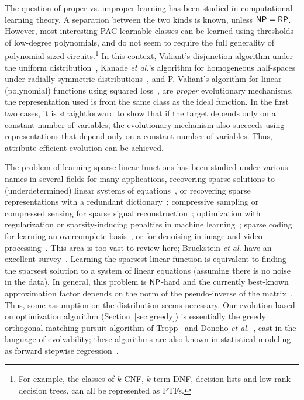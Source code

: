 \documentclass[11pt]{article}
\begin{document}
The question of proper vs. improper learning has been studied in computational
learning theory. A separation between the two kinds is known, unless $\mathsf{NP} =
\mathsf{RP}$. However, most interesting PAC-learnable classes can be learned using
thresholds of low-degree polynomials, and do not seem to require the full
generality of polynomial-sized circuits.\footnote{For example, the classes of
$k$-CNF, $k$-term DNF, decision lists and low-rank decision trees, can all be
represented as PTFs.} In this context, Valiant's disjunction algorithm under the
uniform distribution~\cite{Valiant:2009-evolvability}, Kanade {\it et al.}'s
algorithm for homogeneous half-spaces under radially symmetric
distributions~\cite{KVV:2010-drift}, and P. Valiant's algorithm for linear
(polynomial) functions using squared loss~\cite{Valiant:2012-real}, are
\emph{proper} evolutionary mechanisms, \ie the representation used is from the
same class as the ideal function.  In the first two cases, it is straightforward
to show that if the target depends only on a constant number of variables, the
evolutionary mechanism also succeeds using representations that depend only on a
constant number of variables. Thus, attribute-efficient evolution can be
achieved.

The problem of learning sparse linear functions has been studied under various
names in several fields for many applications, \eg recovering sparse solutions
to (underdetermined) linear systems of equations~\cite{Donoho:2009-sparse}, or
recovering sparse representations with a redundant
dictionary~\cite{Mallat:2008,Elad:2010}; compressive sampling or compressed
sensing for sparse signal reconstruction~\cite{Candes:2008}; optimization with
regularization or sparsity-inducing penalties in machine
learning~\cite{Bach:2012}; sparse coding for learning an overcomplete
basis~\cite{Olshausen:1997}, or for denoising in image and video
processing~\cite{Elad:2010}. This area is too vast to review here; Bruckstein
\emph{et al.} have an excellent survey~\cite{Donoho:2009-sparse}.  Learning the
sparsest linear function is equivalent to finding the sparsest solution to a
system of linear equations (assuming there is no noise in the data). In general,
this problem is $\mathsf{NP}$-hard and the currently best-known approximation factor
depends on the norm of the pseudo-inverse of the matrix~\cite{Natarajan:1995}.
Thus, some assumption on the distribution seems necessary. Our evolution based
on optimization algorithm (Section~\ref{sec:greedy}) is essentially the greedy
orthogonal matching pursuit algorithm of Tropp~\cite{Tropp:2004-greed} and
Donoho \emph{et al.}~\cite{Donoho:2006-recovery}, cast in the language of
evolvability; these algorithms are also known in statistical modeling as forward
stepwise regression~\cite{Daniel:1999,Hastie:2001}.
\end{document}
